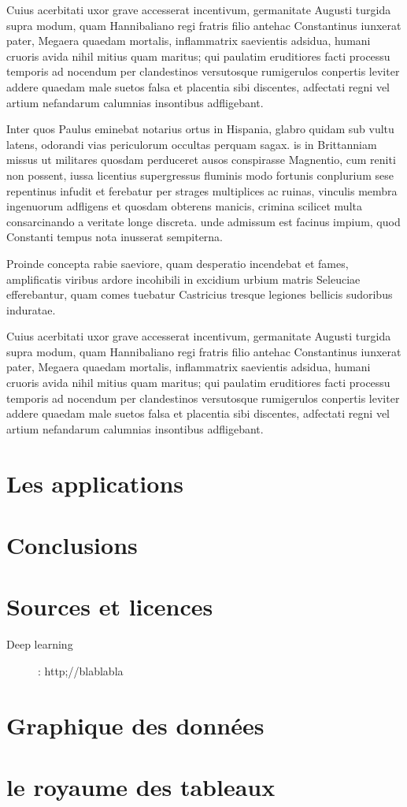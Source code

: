 \documentclass{report}
\begin{document}
Cuius acerbitati uxor grave accesserat incentivum, germanitate Augusti turgida supra modum, quam Hannibaliano regi fratris filio antehac Constantinus iunxerat pater, Megaera quaedam mortalis, inflammatrix saevientis adsidua, humani cruoris avida nihil mitius quam maritus; qui paulatim eruditiores facti processu temporis ad nocendum per clandestinos versutosque rumigerulos conpertis leviter addere quaedam male suetos falsa et placentia sibi discentes, adfectati regni vel artium nefandarum calumnias insontibus adfligebant.

\newpage

Inter quos Paulus eminebat notarius ortus in Hispania, glabro quidam sub vultu latens, odorandi vias periculorum occultas perquam sagax. is in Brittanniam missus ut militares quosdam perduceret ausos conspirasse Magnentio, cum reniti non possent, iussa licentius supergressus fluminis modo fortunis conplurium sese repentinus infudit et ferebatur per strages multiplices ac ruinas, vinculis membra ingenuorum adfligens et quosdam obterens manicis, crimina scilicet multa consarcinando a veritate longe discreta. unde admissum est facinus impium, quod Constanti tempus nota inusserat sempiterna.

Proinde concepta rabie saeviore, quam desperatio incendebat et fames, amplificatis viribus ardore incohibili in excidium urbium matris Seleuciae efferebantur, quam comes tuebatur Castricius tresque legiones bellicis sudoribus induratae.

Cuius acerbitati uxor grave accesserat incentivum, germanitate Augusti turgida supra modum, quam Hannibaliano regi fratris filio antehac Constantinus iunxerat pater, Megaera quaedam mortalis, inflammatrix saevientis adsidua, humani cruoris avida nihil mitius quam maritus; qui paulatim eruditiores facti processu temporis ad nocendum per clandestinos versutosque rumigerulos conpertis leviter addere quaedam male suetos falsa et placentia sibi discentes, adfectati regni vel artium nefandarum calumnias insontibus adfligebant.


\chapter{Les applications}

\chapter*{Conclusions}

\chapter*{Sources et licences}

\begin{description}
 \item [Deep learning]: http;//blablabla
 
\end{description}  

\appendix

\chapter{Graphique des données}

\chapter{le royaume des tableaux}
\end{document}
